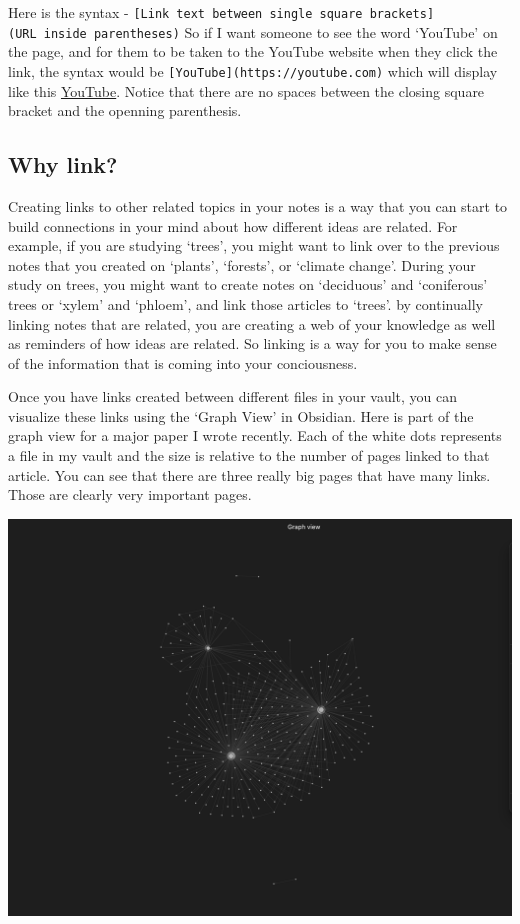 \documentclass[
]{book}
\theoremstyle{definition}
\theoremstyle{definition}
\theoremstyle{definition}
\theoremstyle{definition}
\theoremstyle{remark}
\begin{document}
Here is the syntax - \texttt{{[}Link\ text\ between\ single\ square\ brackets{]}(URL\ inside\ parentheses)} So if I want someone to see the word `YouTube' on the page, and for them to be taken to the YouTube website when they click the link, the syntax would be \texttt{{[}YouTube{]}(https://youtube.com)} which will display like this \href{https://youtube.com}{YouTube}. Notice that there are no spaces between the closing square bracket and the openning parenthesis.

\hypertarget{why-link}{%
\subsection*{Why link?}\label{why-link}}

Creating links to other related topics in your notes is a way that you can start to build connections in your mind about how different ideas are related. For example, if you are studying `trees', you might want to link over to the previous notes that you created on `plants', `forests', or `climate change'. During your study on trees, you might want to create notes on `deciduous' and `coniferous' trees or `xylem' and `phloem', and link those articles to `trees'. by continually linking notes that are related, you are creating a web of your knowledge as well as reminders of how ideas are related. So linking is a way for you to make sense of the information that is coming into your conciousness.

Once you have links created between different files in your vault, you can visualize these links using the `Graph View' in Obsidian. Here is part of the graph view for a major paper I wrote recently. Each of the white dots represents a file in my vault and the size is relative to the number of pages linked to that article. You can see that there are three really big pages that have many links. Those are clearly very important pages.

\includegraphics{assets/u3/graph2.png}
\end{document}
